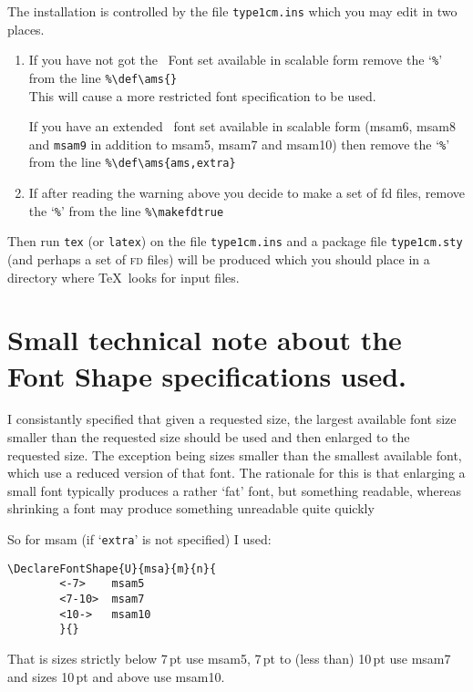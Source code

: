 \documentclass[pagesize=auto]{scrartcl}
\newcommand*{\opt}[1]{\texttt{#1}}
\begin{document}
The installation is controlled by the file \texttt{type1cm.ins} which you may
edit in two places.
%
\begin{enumerate}
\item If you have not got the \AmS\ Font set available in scalable form
  remove the `\verb|%|' from the line \verb|%\def\ams{}|\\
  This will cause a more restricted font specification to be used.

  If you have an extended \AmS\ font set available in scalable form
  (\textsf{msam6}, \textsf{msam8} and \texttt{msam9} in addition to \textsf{msam5}, \textsf{msam7} and \textsf{msam10})
  then remove the `\verb|%|' from the line \verb|%\def\ams{ams,extra}|

\item If after reading the warning above you decide to make a set of fd 
  files, remove the `\verb|%|' from the line \verb|%\makefdtrue|
\end{enumerate}

Then run \texttt{tex} (or \texttt{latex}) on the file \texttt{type1cm.ins} and a package file
\texttt{type1cm.sty} (and perhaps a set of \textsc{fd} files) will be produced
which you should place in a directory where \TeX\ looks for input files.


\section{Small technical note about the Font Shape specifications used.}

I consistantly specified that given a requested size, the largest
available font size smaller than the requested size should be used
and then enlarged to the requested size. The exception being sizes
smaller than the smallest available font, which use a reduced version
of that font. The rationale for this is that enlarging a small font
typically produces a rather `fat' font, but something readable, whereas
shrinking a font may produce something unreadable quite quickly

So for \textsf{msam} (if `\opt{extra}' is not specified) I used:
%
\begin{lstlisting}
\DeclareFontShape{U}{msa}{m}{n}{
        <-7>    msam5 
        <7-10>  msam7
        <10->   msam10
        }{}
\end{lstlisting}
%
That is sizes strictly below 7\,pt use \textsf{msam5}, 7\,pt to (less than) 10\,pt
use \textsf{msam7} and sizes 10\,pt and above use \textsf{msam10}.
\end{document}
